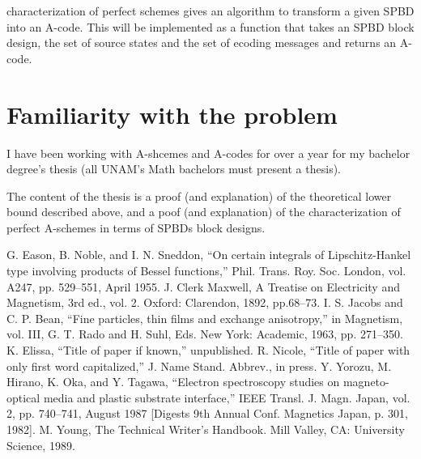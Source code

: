 \documentclass[conference]{IEEEtran}
\begin{document}
\cite{b4} characterization of perfect schemes gives an algorithm to transform a given SPBD into an A-code. This will be implemented as a function that takes an SPBD block design, the set of source states and the set of ecoding messages and returns an A-code.


\newpage
%
%
\section{Familiarity with the problem}
I have been working with A-shcemes and A-codes for over a year for my bachelor degree's thesis (all UNAM's Math bachelors must present a thesis).

The content of the thesis is a proof (and explanation) of the theoretical lower bound described above, and a poof (and explanation) of the characterization of perfect A-schemes in terms of SPBDs block designs.

%
%
\begin{thebibliography}{00}
     G. Eason, B. Noble, and I. N. Sneddon, ``On certain integrals of Lipschitz-Hankel type involving products of Bessel functions,'' Phil. Trans. Roy. Soc. London, vol. A247, pp. 529--551, April 1955.
     J. Clerk Maxwell, A Treatise on Electricity and Magnetism, 3rd ed., vol. 2. Oxford: Clarendon, 1892, pp.68--73.
     I. S. Jacobs and C. P. Bean, ``Fine particles, thin films and exchange anisotropy,'' in Magnetism, vol. III, G. T. Rado and H. Suhl, Eds. New York: Academic, 1963, pp. 271--350.
     K. Elissa, ``Title of paper if known,'' unpublished.
     R. Nicole, ``Title of paper with only first word capitalized,'' J. Name Stand. Abbrev., in press.
     Y. Yorozu, M. Hirano, K. Oka, and Y. Tagawa, ``Electron spectroscopy studies on magneto-optical media and plastic substrate interface,'' IEEE Transl. J. Magn. Japan, vol. 2, pp. 740--741, August 1987 [Digests 9th Annual Conf. Magnetics Japan, p. 301, 1982].
     M. Young, The Technical Writer's Handbook. Mill Valley, CA: University Science, 1989.
\end{thebibliography}
\end{document}
